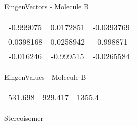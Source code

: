 \begin{multicols}{2}
\begin{center}
\vtab
 EingenVectors - Molecule B     \\
\vtab
\begin{tabular}{|c c c|}
-0.999075	 & 	0.0172851	 & 	-0.0393769	 \\
0.0398168	 & 	0.0258942	 & 	-0.998871	 \\
-0.016246	 & 	-0.999515	 & 	-0.0265584
\end{tabular}

\vtab
 EingenValues - Molecule B     \\
\vtab
\begin{tabular}{|c c c|}
531.698	 & 	929.417	 & 	1355.4	 \\
\end{tabular}

\end{center}
\end{multicols}
\begin{center}
\vtab
\vtab
\textcolor{NavyBlue}{\Large Stereoisomer}
\end{center}

 \newpage

